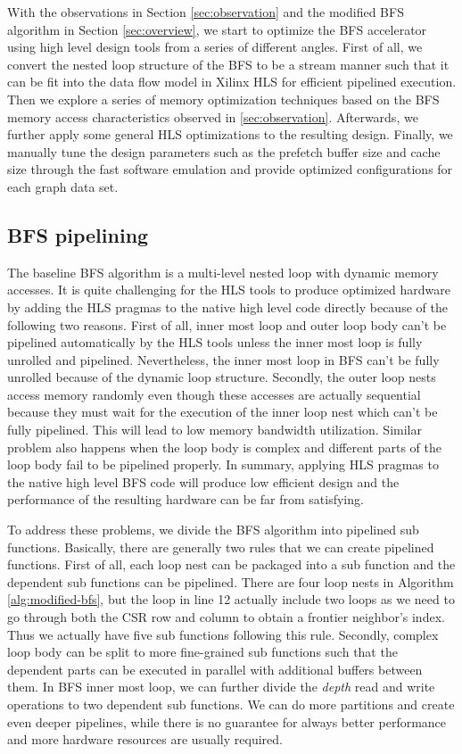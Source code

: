 With the observations in Section \ref{sec:observation} 
and the modified BFS algorithm in Section \ref{sec:overview}, 
we start to optimize the BFS accelerator using high level design tools 
from a series of different angles. First of all, we convert the nested loop structure 
of the BFS to be a stream manner such that it can be fit into the data flow model in
Xilinx HLS for efficient pipelined execution. Then we explore a series of memory optimization 
techniques based on the BFS memory access characteristics observed in \ref{sec:observation}. 
Afterwards, we further apply some general HLS optimizations to the resulting design. Finally, 
we manually tune the design parameters such as the prefetch buffer size and cache size through 
the fast software emulation and provide optimized configurations for each graph data set.

\subsection{BFS pipelining}
The baseline BFS algorithm is a multi-level nested loop with 
dynamic memory accesses. It is quite challenging for the HLS 
tools to produce optimized hardware by adding the HLS pragmas to 
the native high level code directly because of the following two 
reasons. First of all, inner most loop and outer loop body can't be pipelined 
automatically by the HLS tools unless the inner most loop is fully 
unrolled and pipelined. Nevertheless, the inner most loop in BFS 
can't be fully unrolled because of the dynamic loop structure.  
Secondly, the outer loop nests access memory randomly even though 
these accesses are actually sequential because they must wait 
for the execution of the inner loop nest which can't 
be fully pipelined. This will lead to low 
memory bandwidth utilization. Similar problem also happens when the 
loop body is complex and different parts of the loop body fail to be 
pipelined properly. In summary, applying HLS pragmas to the native high level BFS code 
will produce low efficient design and the performance of the resulting hardware 
can be far from satisfying.  

To address these problems, we divide the BFS algorithm into pipelined 
sub functions. Basically, there are generally two rules that 
we can create pipelined functions. 
First of all, each loop nest can be packaged into a sub function 
and the dependent sub functions can be pipelined. There are four loop 
nests in Algorithm \ref{alg:modified-bfs}, 
but the loop in line 12 actually include two loops as we need to go through 
both the CSR row and column to obtain a frontier neighbor's index. Thus we 
actually have five sub functions following this rule. Secondly, complex loop body 
can be split to more fine-grained sub functions such that the dependent parts can 
be executed in parallel with additional buffers between them. 
In BFS inner most loop, we can further divide the \textit{depth} read and write 
operations to two dependent sub functions. We can 
do more partitions and create even deeper pipelines, while there is no 
guarantee for always better performance and more hardware resources 
are usually required.

